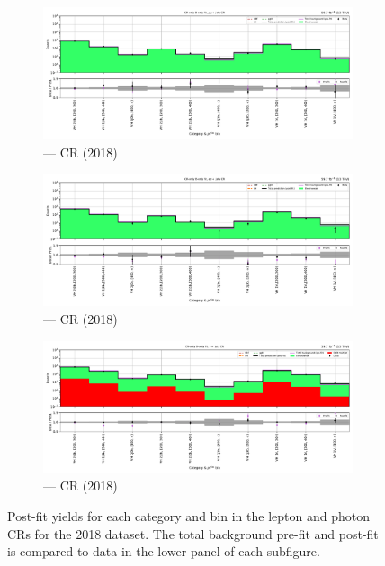 \begin{figure}[htbp]
    \begin{subfigure}[b]{0.49\textwidth}
        \includegraphics[width=\textwidth]{chapters/higgstoinv/figures/mountain_ranges/2018/VH/Zmumu_tree_fit_b-abs_values_VH_cats.pdf}
        \caption{\VH --- \doubleMuCr \gls{CR} (2018)}
    \end{subfigure}
    \hfill
    \begin{subfigure}[b]{0.49\textwidth}
        \includegraphics[width=\textwidth]{chapters/higgstoinv/figures/mountain_ranges/2018/VH/Zee_tree_fit_b-abs_values_VH_cats.pdf}
        \caption{\VH --- \doubleEleCr \gls{CR} (2018)}
    \end{subfigure}

    \begin{subfigure}[b]{0.49\textwidth}
        \includegraphics[width=\textwidth]{chapters/higgstoinv/figures/mountain_ranges/2018/VH/Photon_tree_fit_b-abs_values_VH_cats.pdf}
        \caption{\VH --- \singlePhotonCr \gls{CR} (2018)}
    \end{subfigure}
    \caption[Post-fit yields for each \VH category and \ptmiss bin in the lepton and photon control regions for the 2018 dataset]{Post-fit yields for each \VH category and \ptmiss bin in the lepton and photon \glspl{CR} for the 2018 dataset. The total background pre-fit and post-fit is compared to data in the lower panel of each subfigure.}
    \label{fig:htoinv_mountain_range_VH_2018_CRs}
\end{figure}

